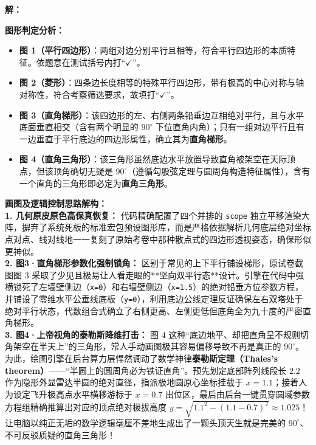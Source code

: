 \documentclass[12pt, a4paper]{ctexrep}
\begin{document}
\vspace{0.4cm}
\textbf{解：}

\textbf{图形判定分析：}
\begin{itemize}
    \item \textbf{图 1（平行四边形）}：两组对边分别平行且相等，符合平行四边形的本质特征。依题意在测试括号内打“$\checkmark$”。
    \item \textbf{图 2（菱形）}：四条边长度相等的特殊平行四边形，带有极高的中心对称与轴对称性，符合考察筛选要求，故填打“$\checkmark$”。
    \item \textbf{图 3（直角梯形）}：该四边形的左、右侧两条铅垂边互相绝对平行，且与水平底面垂直相交（含有两个明显的 $90^\circ$ 下位直角内角）；只有一组对边平行且有一边垂直于平行底边的四边形属性，确立其为\textbf{直角梯形}。
    \item \textbf{图 4（直角三角形）}：该三角形虽然底边水平放置导致直角被架空在天际顶点，但该顶角确切无疑是 $90^\circ$（遵循勾股弦定理与圆周角构造特征属性），含有一个直角的三角形即必定为\textbf{直角三角形}。
\end{itemize}

\vspace{0.4cm}
{\small\color{blue!70!black}
\textbf{画图及逻辑控制思路解构：}\\
\textbf{1. 几何原皮原色高保真恢复：} 代码精确配置了四个并排的 \texttt{scope} 独立平移渲染大阵，摒弃了系统死板的标准宏包预设图形库，而是严格依据解析几何底层绝对坐标点对点、线对线地一一复刻了原始考卷中那种散点式的四边形透视姿态，确保形似更神似。\\
\textbf{2. 图3·直角梯形参数化强制锁角：} 区别于常见的上下平行铺设梯形，原试卷截图图 3 采取了少见且极易让人看走眼的**坚向双平行态**设计。引擎在代码中强横锁死了左墙壁侧边（\texttt{x=0}）和右墙壁侧边（\texttt{x=1.5}）的绝对铅垂方位参数方程，并铺设了零维水平公垂线底板（\texttt{y=0}），利用底边公线定理反证确保左右双塔处于绝对平行状态，代数组合式确立了右侧更高、左侧更低但底角全为九十度的严密直角梯形。\\
\textbf{3. 图4·上帝视角的泰勒斯降维打击：} 图 4 这种“底边地平、却把直角呈不规则切角架空在半天上”的三角形，常人手动画图极其容易偏移导致不再是真正的 $90^\circ$。为此，绘图引擎在后台算力层悍然调动了数学神律\textbf{泰勒斯定理（Thales's theorem）}——“半圆上的圆周角必为铁证直角”。预先划定底部阵列线段长 $2.2$ 作为隐形外显雷达半圆的绝对直径，指派极地圆原心坐标挂载于 $x=1.1$；接着人为设定飞升极高点水平横移游标于 $x=0.7$ 出位区，最后由后台一键贯穿圆域参数方程组精确推算出对应的顶点绝对极拔高度 $y = \sqrt{1.1^2 - (1.1-0.7)^2} \approx 1.025$！让电脑以纯正无垢的数学逻辑毫厘不差地生成出了一颗头顶天生就是完美的 $90^\circ$、不可反驳质疑的直角三角形！
}
\end{document}
